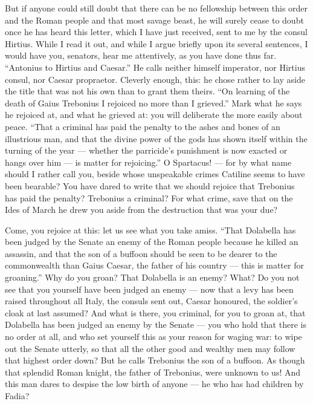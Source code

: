  But if anyone could still doubt that there can be no fellowship between this order and the Roman people and that most savage beast, he will surely cease to doubt once he has heard this letter, which I have just received, sent to me by the consul Hirtius. While I read it out, and while I argue briefly upon its several sentences, I would have you, senators, hear me attentively, as you have done thus far. ``Antonius to Hirtius and Caesar.'' He calls neither himself imperator, nor Hirtius consul, nor Caesar propraetor. Cleverly enough, this: he chose rather to lay aside the title that was not his own than to grant them theirs. ``On learning of the death of Gaius Trebonius I rejoiced no more than I grieved.'' Mark what he says he rejoiced at, and what he grieved at: you will deliberate the more easily about peace. ``That a criminal has paid the penalty to the ashes and bones of an illustrious man, and that the divine power of the gods has shown itself within the turning of the year --- whether the parricide's punishment is now exacted or hangs over him --- is matter for rejoicing.'' O Spartacus! --- for by what name should I rather call you, beside whose unspeakable crimes Catiline seems to have been bearable? You have dared to write that we should rejoice that Trebonius has paid the penalty? Trebonius a criminal? For what crime, save that on the Ides of March he drew you aside from the destruction that was your due?

 Come, you rejoice at this: let us see what you take amiss. ``That Dolabella has been judged by the Senate an enemy of the Roman people because he killed an assassin, and that the son of a buffoon should be seen to be dearer to the commonwealth than Gaius Caesar, the father of his country --- this is matter for groaning.'' Why do you groan? That Dolabella is an enemy? What? Do you not see that you yourself have been judged an enemy --- now that a levy has been raised throughout all Italy, the consuls sent out, Caesar honoured, the soldier's cloak at last assumed? And what is there, you criminal, for you to groan at, that Dolabella has been judged an enemy by the Senate --- you who hold that there is no order at all, and who set yourself this as your reason for waging war: to wipe out the Senate utterly, so that all the other good and wealthy men may follow that highest order down? But he calls Trebonius the son of a buffoon. As though that splendid Roman knight, the father of Trebonius, were unknown to us! And this man dares to despise the low birth of anyone --- he who has had children by Fadia?

